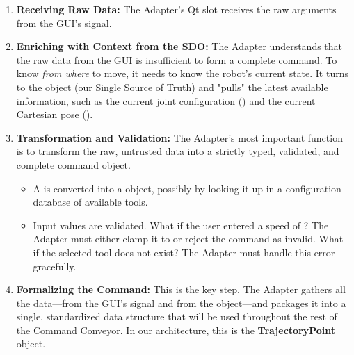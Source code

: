 \begin{enumerate}
    \item \textbf{Receiving Raw Data:} The Adapter's Qt slot receives the raw arguments from the GUI's signal.
    
    \item \textbf{Enriching with Context from the SDO:} The Adapter understands that the raw data from the GUI is insufficient to form a complete command. To know \textit{from where} to move, it needs to know the robot's current state. It turns to the  object (our Single Source of Truth) and "pulls" the latest available information, such as the current joint configuration () and the current Cartesian pose ().
    
    \item \textbf{Transformation and Validation:} The Adapter's most important function is to transform the raw, untrusted data into a strictly typed, validated, and complete command object.
    \begin{itemize}
        \item A  is converted into a  object, possibly by looking it up in a configuration database of available tools.
        \item Input values are validated. What if the user entered a speed of ? The Adapter must either clamp it to  or reject the command as invalid. What if the selected tool does not exist? The Adapter must handle this error gracefully.
    \end{itemize}
    
    \item \textbf{Formalizing the Command:} This is the key step. The Adapter gathers all the data—from the GUI's signal and from the  object—and packages it into a single, standardized data structure that will be used throughout the rest of the Command Conveyor. In our architecture, this is the \textbf{TrajectoryPoint} object.
\end{enumerate}



